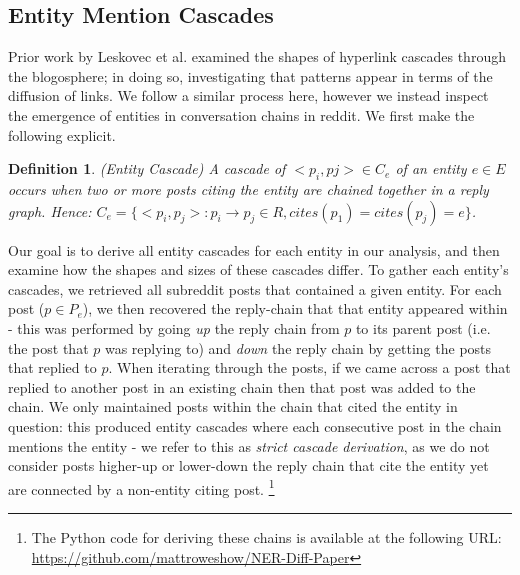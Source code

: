 \documentclass[journal,10pt,draftclsnofoot,onecolumn]{IEEEtran}
\newtheorem{mydef}{Definition}
\begin{document}
\subsection{Entity Mention Cascades}
Prior work by Leskovec et al. \cite{leskovec2007patterns} examined the shapes of hyperlink cascades through the blogosphere; in doing so, investigating that patterns appear in terms of the diffusion of links.
We follow a similar process here, however we instead inspect the emergence of entities in conversation chains in reddit.
We first make the following explicit.

\begin{mydef}
(Entity Cascade) A cascade of ${<p_i, pj>} \in C_e$ of an entity $e \in E$ occurs when two or more posts citing the entity are chained together in a reply graph. 
Hence: $C_e = \{<p_i, p_j> : p_i \rightarrow p_j \in R, cites(p_1) = cites(p_j) = e\}$.
\end{mydef}

Our goal is to derive all entity cascades for each entity in our analysis, and then examine how the shapes and sizes of these cascades differ.
To gather each entity's cascades, we retrieved all subreddit posts that contained a given entity.
For each post ($p \in P_e$), we then recovered the reply-chain that that entity appeared within - this was performed by going \emph{up} the reply chain from $p$ to its parent post (i.e. the post that $p$ was replying to) and \emph{down} the reply chain by getting the posts that replied to $p$.
When iterating through the posts, if we came across a post that replied to another post in an existing chain then that post was added to the chain.
We only maintained posts within the chain that cited the entity in question: this produced entity cascades where each consecutive post in the chain mentions the entity - we refer to this as \emph{strict cascade derivation}, as we do not consider posts higher-up or lower-down the reply chain that cite the entity yet are connected by a non-entity citing post. \footnote{The Python code for deriving these chains is available at the following URL: \url{https://github.com/mattroweshow/NER-Diff-Paper}}
\end{document}
